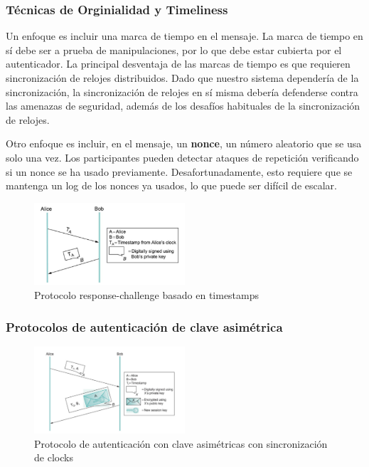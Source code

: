 \subsubsection{Técnicas de Orginialidad y Timeliness}
Un enfoque es incluir una marca de tiempo en el mensaje. La marca de tiempo en sí debe ser a prueba de manipulaciones, por lo que debe estar cubierta por el autenticador. La principal desventaja de las marcas de tiempo es que requieren sincronización de relojes distribuidos. Dado que nuestro sistema dependería de la sincronización, la sincronización de relojes en sí misma debería defenderse contra las amenazas de seguridad, además de los desafíos habituales de la sincronización de relojes.

Otro enfoque es incluir, en el mensaje, un \textbf{nonce}, un número aleatorio que se usa solo una vez. Los participantes pueden detectar ataques de repetición verificando si un nonce se ha usado previamente. Desafortunadamente, esto requiere que se mantenga un log de los nonces ya usados, lo que puede ser difícil de escalar.

\begin{figure}[H]
	\centering
	\includegraphics[width=0.5\textwidth
]{images/response-challenge-protocol.png}
	\caption[Protocolo response-challenge]{Protocolo response-challenge basado en timestamps}
	\label{fig:response-challenge-protocol}
\end{figure}

\subsubsection*{Protocolos de autenticación de clave asimétrica}
\begin{figure}[H]
	\centering
	\includegraphics[width=0.5\textwidth
]{images/public-key-authentication.png}
	\caption[Protocolo de autenticación con clave asimétricas]{Protocolo de autenticación con clave asimétricas con sincronización de clocks}
	\label{fig:public-key-authentication}
\end{figure}

